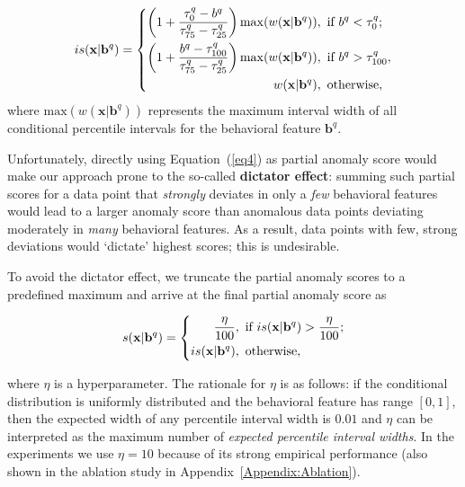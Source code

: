 \documentclass[pdflatex,sn-basic]{sn-jnl}%
\theoremstyle{thmstyleone}%
\theoremstyle{thmstyletwo}%
\theoremstyle{thmstylethree}%
\begin{document}
\begin{equation}
\centering
is(\mathbf{x}\rvert\mathbf{b}^{q})=\left\{
\begin{aligned}\left(1+\frac{\tau_{0}^{q}-b^{q}}{\tau_{75}^{q}-\tau_{25}^{q}}\right)\mathrm{max}(w(\mathbf{x}\rvert\mathbf{b}^{q}))&, \text{ if } b^{q} < \tau_{0}^{q} ; \\
\left(1+\frac{b^{q}-\tau_{100}^{q}}{\tau_{75}^{q}-\tau_{25}^{q}}\right)\mathrm{max}(w(\mathbf{x}\rvert\mathbf{b}^{q}))&, \text{ if }  b^{q} > \tau_{100}^{q}, \\
w(\mathbf{x}\rvert\mathbf{b}^{q})&, \text{ otherwise},\\
\end{aligned}
\right.
\label{eq4}
\end{equation}
where $\mathrm{max}(w(\mathbf{x}\rvert\mathbf{b}^{q}))$ represents the maximum interval width of all conditional percentile intervals for the behavioral feature $\textbf{b}^{q}$.

Unfortunately, directly using Equation~(\ref{eq4}) as partial anomaly score would make our approach prone to the so-called \textbf{dictator effect}: summing such partial scores for a data point that \emph{strongly} deviates in only a \emph{few} behavioral features would lead to a larger anomaly score than anomalous data points deviating moderately in \emph{many} behavioral features. As a result, data points with few, strong deviations would `dictate' highest scores; this is undesirable.

To avoid the dictator effect, we truncate the partial anomaly scores to a predefined maximum and arrive at the final partial anomaly score as

\begin{equation}
\centering
s(\mathbf{x}\rvert\mathbf{b}^{q})=\left\{
\begin{aligned} \frac{\eta}{100} &, \text{ if } is(\mathbf{x}\rvert\mathbf{b}^{q}) > \frac{\eta}{100}; \\
is(\mathbf{x}\rvert\mathbf{b}^{q})&, \text{ otherwise}, \\
\end{aligned}
\right.
\label{eq6}
\end{equation}

where $\eta$ is a hyperparameter. The rationale for $\eta$ is as follows: if the conditional distribution is uniformly distributed and the behavioral feature has range $[0,1]$, then the expected width of any percentile interval width is $0.01$ and $\eta$ can be interpreted as the maximum number of \emph{expected percentile interval widths}. In the experiments we use $\eta = 10$ because of its strong empirical performance (also shown in the ablation study in Appendix~\ref{Appendix:Ablation}). 
\end{document}
